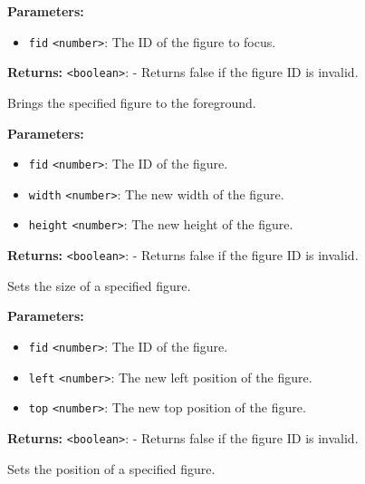 \documentclass[12pt,a4paper]{article}
\begin{document}
\noindent \textbf{Parameters:}
\begin{itemize}
  \item \texttt{fid} \texttt{<number>}: The ID of the figure to focus.
\end{itemize}

\noindent \textbf{Returns:} \texttt{<boolean>}: - Returns false if the figure ID is invalid.

\noindent Brings the specified figure to the foreground.

\vspace{5mm}
\noindent {}


\noindent \textbf{Parameters:}
\begin{itemize}
  \item \texttt{fid} \texttt{<number>}: The ID of the figure.
  \item \texttt{width} \texttt{<number>}: The new width of the figure.
  \item \texttt{height} \texttt{<number>}: The new height of the figure.
\end{itemize}

\noindent \textbf{Returns:} \texttt{<boolean>}: - Returns false if the figure ID is invalid.

\noindent Sets the size of a specified figure.

\vspace{5mm}
\noindent {}


\noindent \textbf{Parameters:}
\begin{itemize}
  \item \texttt{fid} \texttt{<number>}: The ID of the figure.
  \item \texttt{left} \texttt{<number>}: The new left position of the figure.
  \item \texttt{top} \texttt{<number>}: The new top position of the figure.
\end{itemize}

\noindent \textbf{Returns:} \texttt{<boolean>}: - Returns false if the figure ID is invalid.

\noindent Sets the position of a specified figure.

\vspace{5mm}
\noindent {}
\end{document}
